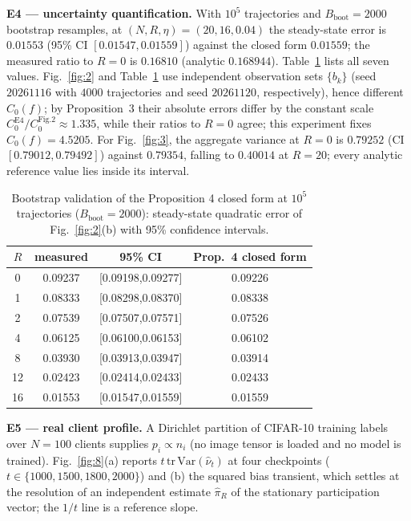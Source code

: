 \documentclass[twoside,11pt]{article}
\begin{document}
\textbf{E4 --- uncertainty quantification.} With $10^{5}$
trajectories and $B_{\mathrm{boot}}=2000$ bootstrap resamples, at
$(N,R,\eta)=(20,16,0.04)$ the steady-state error is $0.01553$ (95\% CI
$[0.01547,0.01559]$) against the closed form $0.01559$; the measured ratio
to $R=0$ is $0.16810$ (analytic $0.168944$). Table~\ref{table:V} lists all
seven values. Fig.~\ref{fig:2} and Table~\ref{table:V} use independent
observation sets $\{b_k\}$ (seed $20261116$ with $4000$ trajectories and
seed $20261120$, respectively), hence different $C_0(f)$; by Proposition~3
their absolute errors differ by the constant scale
$C_0^{\mathrm{E4}}/C_0^{\mathrm{Fig.2}}\approx1.335$, while their ratios to $R=0$
agree; this experiment fixes $C_0(f)=4.5205$.
For Fig.~\ref{fig:3}, the aggregate variance at $R=0$ is
$0.79252$ (CI $[0.79012,0.79492]$) against $0.79354$, falling to $0.40014$
at $R=20$; every analytic reference value lies inside its interval.

\begin{table}[!t]
\small
\centering
\begin{tabular}{@{}cccc@{}}
\toprule
$R$ & measured & 95\% CI & Prop.~4 closed form \\
\midrule
0 & 0.09237 & [0.09198,0.09277] & 0.09226 \\
1 & 0.08333 & [0.08298,0.08370] & 0.08338 \\
2 & 0.07539 & [0.07507,0.07571] & 0.07526 \\
4 & 0.06125 & [0.06100,0.06153] & 0.06102 \\
8 & 0.03930 & [0.03913,0.03947] & 0.03914 \\
12 & 0.02423 & [0.02414,0.02433] & 0.02433 \\
16 & 0.01553 & [0.01547,0.01559] & 0.01559 \\
\bottomrule
\end{tabular}
\caption{Bootstrap validation of the Proposition 4 closed form at $10^5$ trajectories ($B_{\mathrm{boot}}=2000$): steady-state quadratic error of Fig.~\ref{fig:2}(b) with 95\% confidence intervals.}
\label{table:V}
\end{table}

\textbf{E5 --- real client profile.} A Dirichlet partition of CIFAR-10
training labels over $N=100$ clients supplies $p_i\propto n_i$ (no image
tensor is loaded and no model is trained). Fig.~\ref{fig:8}(a) reports
$t\,\mathrm{tr\,Var}(\hat\nu_t)$ at four checkpoints
($t\in\{1000,1500,1800,2000\}$) and (b) the squared bias
transient, which settles at the resolution of an independent estimate
$\hat\pi_R$ of the stationary participation vector; the $1/t$ line is a
reference slope.
\end{document}
